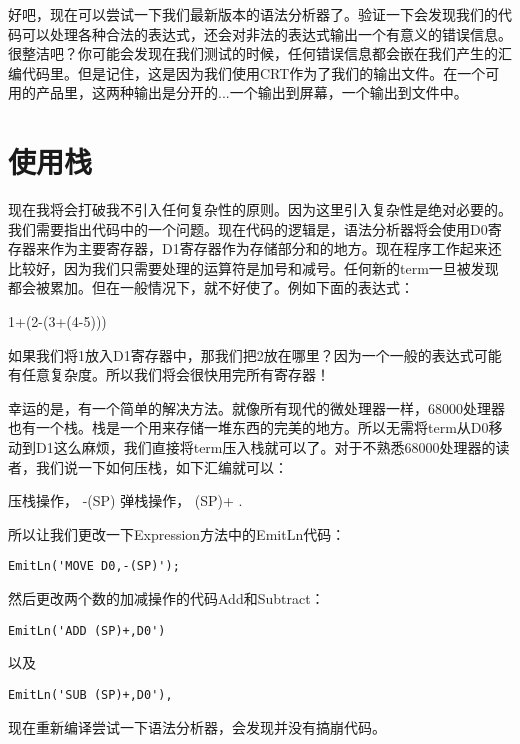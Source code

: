好吧，现在可以尝试一下我们最新版本的语法分析器了。验证一下会发现我们的代码可以处理各种合法的表达式，还会对非法的表达式输出一个有意义的错误信息。很整洁吧？你可能会发现在我们测试的时候，任何错误信息都会嵌在我们产生的汇编代码里。但是记住，这是因为我们使用CRT作为了我们的输出文件。在一个可用的产品里，这两种输出是分开的...一个输出到屏幕，一个输出到文件中。

\section{使用栈}

现在我将会打破我不引入任何复杂性的原则。因为这里引入复杂性是绝对必要的。我们需要指出代码中的一个问题。现在代码的逻辑是，语法分析器将会使用D0寄存器来作为主要寄存器，D1寄存器作为存储部分和的地方。现在程序工作起来还比较好，因为我们只需要处理的运算符是加号和减号。任何新的term一旦被发现都会被累加。但在一般情况下，就不好使了。例如下面的表达式：

\begin{tcolorbox}
1+(2-(3+(4-5)))
\end{tcolorbox}

如果我们将1放入D1寄存器中，那我们把2放在哪里？因为一个一般的表达式可能有任意复杂度。所以我们将会很快用完所有寄存器！

幸运的是，有一个简单的解决方法。就像所有现代的微处理器一样，68000处理器也有一个栈。栈是一个用来存储一堆东西的完美的地方。所以无需将term从D0移动到D1这么麻烦，我们直接将term压入栈就可以了。对于不熟悉68000处理器的读者，我们说一下如何压栈，如下汇编就可以：

\begin{tcolorbox}
压栈操作，     -(SP)
弹栈操作，     (SP)+ .
\end{tcolorbox}

所以让我们更改一下Expression方法中的EmitLn代码：

\begin{verbatim}
EmitLn('MOVE D0,-(SP)');
\end{verbatim}

然后更改两个数的加减操作的代码Add和Subtract：

\begin{verbatim}
EmitLn('ADD (SP)+,D0')
\end{verbatim}

以及

\begin{verbatim}
EmitLn('SUB (SP)+,D0'),
\end{verbatim}

现在重新编译尝试一下语法分析器，会发现并没有搞崩代码。

